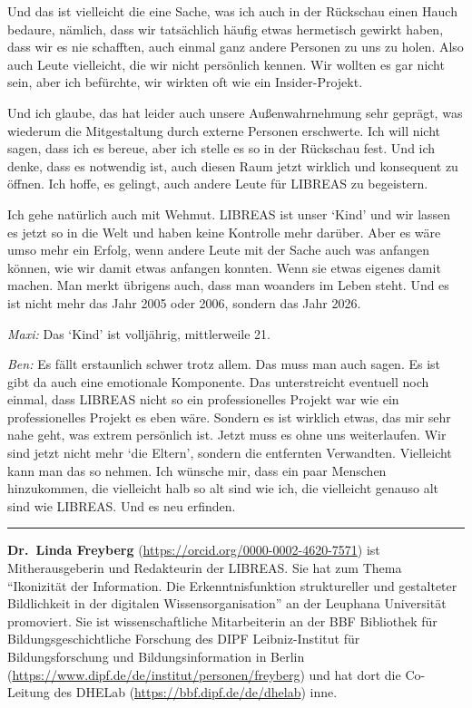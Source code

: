 \documentclass[a4paper,
fontsize=11pt,
oneside,
numbers=noperiodatend,
parskip=half-,
bibliography=totoc,
final
]{scrartcl}
\begin{document}
Und das ist vielleicht die eine Sache, was ich auch in der Rückschau
einen Hauch bedaure, nämlich, dass wir tatsächlich häufig etwas
hermetisch gewirkt haben, dass wir es nie schafften, auch einmal ganz
andere Personen zu uns zu holen. Also auch Leute vielleicht, die wir
nicht persönlich kennen. Wir wollten es gar nicht sein, aber ich
befürchte, wir wirkten oft wie ein Insider-Projekt.

Und ich glaube, das hat leider auch unsere Außenwahrnehmung sehr
geprägt, was wiederum die Mitgestaltung durch externe Personen
erschwerte. Ich will nicht sagen, dass ich es bereue, aber ich stelle es
so in der Rückschau fest. Und ich denke, dass es notwendig ist, auch
diesen Raum jetzt wirklich und konsequent zu öffnen. Ich hoffe, es
gelingt, auch andere Leute für LIBREAS zu begeistern.

Ich gehe natürlich auch mit Wehmut. LIBREAS ist unser \enquote*{Kind}
und wir lassen es jetzt so in die Welt und haben keine Kontrolle mehr
darüber. Aber es wäre umso mehr ein Erfolg, wenn andere Leute mit der
Sache auch was anfangen können, wie wir damit etwas anfangen konnten.
Wenn sie etwas eigenes damit machen. Man merkt übrigens auch, dass man
woanders im Leben steht. Und es ist nicht mehr das Jahr 2005 oder 2006,
sondern das Jahr 2026.

\emph{Maxi:} Das \enquote*{Kind} ist volljährig, mittlerweile 21.

\emph{Ben:} Es fällt erstaunlich schwer trotz allem. Das muss man auch
sagen. Es ist gibt da auch eine emotionale Komponente. Das unterstreicht
eventuell noch einmal, dass LIBREAS nicht so ein professionelles Projekt
war wie ein professionelles Projekt es eben wäre. Sondern es ist
wirklich etwas, das mir sehr nahe geht, was extrem persönlich ist. Jetzt
muss es ohne uns weiterlaufen. Wir sind jetzt nicht mehr \enquote*{die
Eltern}, sondern die entfernten Verwandten. Vielleicht kann man das so
nehmen. Ich wünsche mir, dass ein paar Menschen hinzukommen, die
vielleicht halb so alt sind wie ich, die vielleicht genauso alt sind wie
LIBREAS. Und es neu erfinden.

\begin{center}\rule{0.5\linewidth}{0.5pt}\end{center}

\textbf{Dr.~Linda Freyberg}
(\url{https://orcid.org/0000-0002-4620-7571}) ist Mitherausgeberin und
Redakteurin der LIBREAS. Sie hat zum Thema \enquote{Ikonizität der Information.
Die Erkenntnisfunktion struktureller und gestalteter Bildlichkeit in der
digitalen Wissensorganisation} an der Leuphana Universität promoviert.
Sie ist wissenschaftliche Mitarbeiterin an der BBF \textbar{} Bibliothek
für Bildungsgeschichtliche Forschung des DIPF \textbar{}
Leibniz-Institut für Bildungsforschung und Bildungsinformation in Berlin
(\url{https://www.dipf.de/de/institut/personen/freyberg}) und hat dort
die Co-Leitung des DHELab (\url{https://bbf.dipf.de/de/dhelab}) inne.
\end{document}
